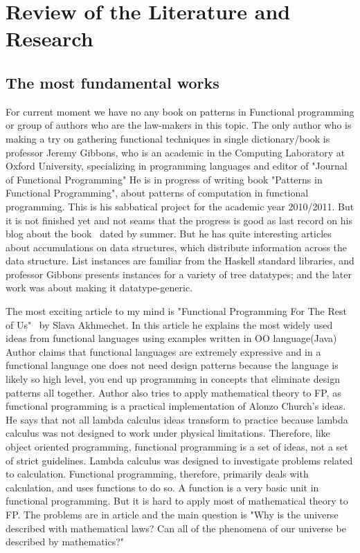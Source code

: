 \chapter{Review of the Literature and Research}
\label{chap:literature}

\section{The most fundamental works}
For current moment we have no any book on patterns in Functional programming or group of authors who are the law-makers in this topic.
The only author who is making a try on gathering functional techniques in single dictionary/book is professor Jeremy Gibbons, who is an academic in the Computing Laboratory at Oxford University, specializing in programming languages and editor of "Journal of Functional Programming"
He is in progress of writing book "Patterns in Functional Programming", about patterns of computation in functional programming. This is his sabbatical project for the academic year 2010/2011. But it is not finished yet and not seams that the progress is good as last record on his blog about the book~\cite{res21} dated by summer.
But he has quite interesting articles about accumulations on data structures, which distribute information across the data structure. List instances are familiar from the Haskell standard libraries, and professor Gibbons presents instances for a variety of tree datatypes; and the later work was about making it datatype-generic.

The most exciting article to my mind is "Functional Programming For The Rest of Us"~\cite{res1} by Slava Akhmechet.
In this article he explains the most widely used ideas from functional languages using examples written in OO language(Java)
Author claims that functional languages are extremely expressive and in a functional language one does not need design patterns because the language is likely so high level, you end up programming in concepts that eliminate design patterns all together.
Author also tries to apply mathematical theory to FP, as functional programming is a practical implementation of Alonzo Church's ideas. He says that not all lambda calculus ideas transform to practice because lambda calculus was not designed to work under physical limitations. Therefore, like object oriented programming, functional programming is a set of ideas, not a set of strict guidelines. Lambda calculus was designed to investigate problems related to calculation. Functional programming, therefore, primarily deals with calculation, and uses functions to do so. A function is a very basic unit in functional programming. But it is hard to apply most of mathematical theory to FP. The problems are in article and the main question is "Why is the universe described with mathematical laws? Can all of the phenomena of our universe be described by mathematics?"


